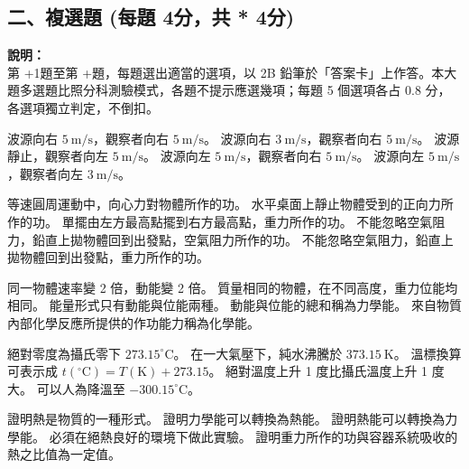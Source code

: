 \documentclass[10pt,a4paper]{article}
\newcommand{\mcscore}{4}
\begin{document}
\subsection*{二、複選題 (每題 \mcscore 分，共 \the\numexpr {} * \mcscore \relax 分)}
\begin{center}
    \begin{tcolorbox}[colframe=black, colback=white, halign=left, width=\textwidth, arc=2mm]
        \small \textbf{說明：} \\
        第 \the\numexpr\value{qcount}+1\relax 題至第 \the\numexpr\value{qcount}+\relax 題，每題選出適當的選項，以 2B 鉛筆於「答案卡」上作答。本大題多選題比照分科測驗模式，各題不提示應選幾項；每題 5 個選項各占 0.8 分，各選項獨立判定，不倒扣。 \\
    \end{tcolorbox}
\end{center}

{波源向右 $5\ \mathrm{m}/\mathrm{s}$，觀察者向右 $5\ \mathrm{m}/\mathrm{s}$。}
{波源向右 $3\ \mathrm{m}/\mathrm{s}$，觀察者向右 $5\ \mathrm{m}/\mathrm{s}$。}
{波源靜止，觀察者向左 $5\ \mathrm{m}/\mathrm{s}$。}
{波源向左 $5\ \mathrm{m}/\mathrm{s}$，觀察者向右 $5\ \mathrm{m}/\mathrm{s}$。}
{波源向左 $5\ \mathrm{m}/\mathrm{s}$，觀察者向左 $3\ \mathrm{m}/\mathrm{s}$。}

{等速圓周運動中，向心力對物體所作的功。}
{水平桌面上靜止物體受到的正向力所作的功。}
{單擺由左方最高點擺到右方最高點，重力所作的功。}
{不能忽略空氣阻力，鉛直上拋物體回到出發點，空氣阻力所作的功。}
{不能忽略空氣阻力，鉛直上拋物體回到出發點，重力所作的功。}

{同一物體速率變 2 倍，動能變 2 倍。}
{質量相同的物體，在不同高度，重力位能均相同。}
{能量形式只有動能與位能兩種。}
{動能與位能的總和稱為力學能。}
{來自物質內部化學反應所提供的作功能力稱為化學能。}

{絕對零度為攝氏零下 $273.15^\circ\mathrm{C}$。}
{在一大氣壓下，純水沸騰於 $373.15\ \mathrm{K}$。}
{溫標換算可表示成 $t(^\circ\mathrm{C})=T(\mathrm{K})+273.15$。}
{絕對溫度上升 1 度比攝氏溫度上升 1 度大。}
{可以人為降溫至 $-300.15^\circ\mathrm{C}$。}

{證明熱是物質的一種形式。}
{證明力學能可以轉換為熱能。}
{證明熱能可以轉換為力學能。}
{必須在絕熱良好的環境下做此實驗。}
{證明重力所作的功與容器系統吸收的熱之比值為一定值。}
\end{document}
